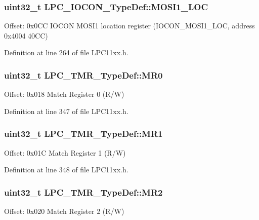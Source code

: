 \subsubsection[{\texorpdfstring{M\+O\+S\+I1\+\_\+\+L\+OC}{MOSI1_LOC}}]{ uint32\+\_\+t L\+P\+C\+\_\+\+I\+O\+C\+O\+N\+\_\+\+Type\+Def\+::\+M\+O\+S\+I1\+\_\+\+L\+OC}\hypertarget{group___l_p_c11xx___definitions_ga50678fa63c5721d9e4622405102531be}{}\label{group___l_p_c11xx___definitions_ga50678fa63c5721d9e4622405102531be}
Offset\+: 0x0\+CC I\+O\+C\+ON M\+O\+S\+I1 location register (I\+O\+C\+O\+N\+\_\+\+M\+O\+S\+I1\+\_\+\+L\+OC, address 0x4004 40\+CC) 

Definition at line 264 of file L\+P\+C11xx.\+h.

\subsubsection[{\texorpdfstring{M\+R0}{MR0}}]{ uint32\+\_\+t L\+P\+C\+\_\+\+T\+M\+R\+\_\+\+Type\+Def\+::\+M\+R0}\hypertarget{group___l_p_c11xx___definitions_ga40a2277815b2fc2275ece428e1de2366}{}\label{group___l_p_c11xx___definitions_ga40a2277815b2fc2275ece428e1de2366}
Offset\+: 0x018 Match Register 0 (R/W) 

Definition at line 347 of file L\+P\+C11xx.\+h.

\subsubsection[{\texorpdfstring{M\+R1}{MR1}}]{ uint32\+\_\+t L\+P\+C\+\_\+\+T\+M\+R\+\_\+\+Type\+Def\+::\+M\+R1}\hypertarget{group___l_p_c11xx___definitions_ga2b3e31390f522f8fc5f302901b16f40b}{}\label{group___l_p_c11xx___definitions_ga2b3e31390f522f8fc5f302901b16f40b}
Offset\+: 0x01C Match Register 1 (R/W) 

Definition at line 348 of file L\+P\+C11xx.\+h.

\subsubsection[{\texorpdfstring{M\+R2}{MR2}}]{ uint32\+\_\+t L\+P\+C\+\_\+\+T\+M\+R\+\_\+\+Type\+Def\+::\+M\+R2}\hypertarget{group___l_p_c11xx___definitions_gaa364c4a95084f74482259dae570a5b08}{}\label{group___l_p_c11xx___definitions_gaa364c4a95084f74482259dae570a5b08}
Offset\+: 0x020 Match Register 2 (R/W) 


